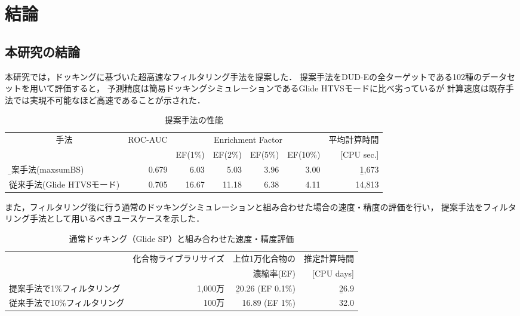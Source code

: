 \chapter{結論}
\section{本研究の結論}\label{sec:conclusion}
本研究では，ドッキングに基づいた超高速なフィルタリング手法を提案した．
提案手法をDUD-Eの全ターゲットである102種のデータセットを用いて評価すると，
予測精度は簡易ドッキングシミュレーションであるGlide HTVSモードに比べ劣っているが
計算速度は既存手法では実現不可能なほど高速であることが示された．
\begin{table}[h] \centering
	\caption{提案手法の性能}
	\label{table:conclusion_1}
	\begin{tabular}{l|rrrrrr}
	\hline
	\multicolumn{1}{c|}{\multirow{2}{*}{手法}}	&\multirow{2}{*}{ROC-AUC}	&\multicolumn{4}{c}{Enrichment Factor}	&平均計算時間	\\
										&						&EF(1\%)	&EF(2\%)	&EF(5\%)	&EF(10\%)	&[CPU sec.]		\\ \hline
	\b{提案手法(maxsumBS)}				&0.679					&6.03	&5.03	&3.96	&3.00		&\b{1,673}		\\
	従来手法(Glide HTVSモード)				&0.705				&16.67	&11.18	&6.38	&4.11		&14,813			\\ \hline
	\end{tabular}
\end{table}



また，フィルタリング後に行う通常のドッキングシミュレーションと組み合わせた場合の速度・精度の評価を行い，
提案手法をフィルタリング手法として用いるべきユースケースを示した．
\begin{table}[htbp] \centering
	\caption{通常ドッキング（Glide SP）と組み合わせた速度・精度評価}
	\label{table:conclusion_2}
	\begin{tabular}{l|rrr}
	\hline
												&\multirow{2}{*}{化合物ライブラリサイズ}	&上位1万化合物の		&推定計算時間	\\
												&														&濃縮率(EF)				&[CPU days]		\\ \hline
	提案手法で1\%フィルタリング		&1,000万											&\b{20.26 (EF 0.1\%)}		&\b{26.9}				\\
	従来手法で10\%フィルタリング	&100万												&16.89 (EF 1\%)			&32.0				\\ \hline
	\end{tabular}
\end{table}


